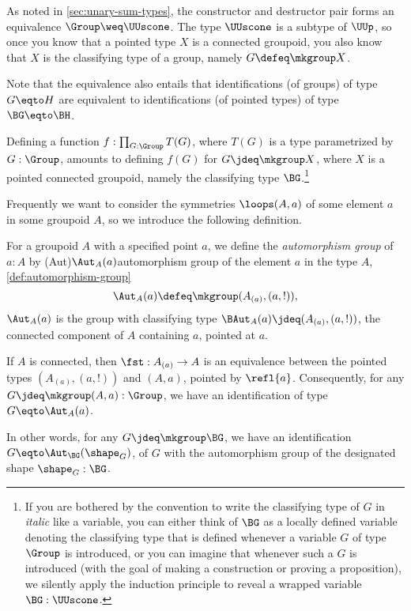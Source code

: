 \begin{remark}\label{rem:aut}
  As noted in \cref{sec:unary-sum-types},
  the constructor and destructor pair forms an equivalence $\Group \weq \UUscone$.
  The type $\UUscone$ is a subtype of $\UUp$, so
  once you know that a pointed type $X$ is a connected groupoid,
  you also know that $X$ is the classifying type of a group,
  namely $G\defeq\mkgroup X$.

  Note that the equivalence also entails that identifications (of groups) of type $G \eqto H$ are equivalent to identifications (of pointed
  types) of type $\BG \eqto \BH$.
\end{remark}

\begin{remark}\label{rem:BG-convention}
  Defining a function $f : \prod_{G:\Group}T(G)$,
  where $T(G)$ is a type parametrized by $G:\Group$,
  amounts to defining $f(G)$ for $G\jdeq\mkgroup X$,
  where $X$ is a pointed connected groupoid,
  namely the classifying type $\BG$.\footnote{%
    If you are bothered by the convention
    to write the classifying type of $G$ in \emph{italic} like a variable,
    you can either think of $\BG$ as a locally defined
    variable denoting the classifying type that is
    defined whenever a variable $G$ of type $\Group$ is introduced,
    or you can imagine that whenever such a $G$ is introduced
    (with the goal of making a construction or proving a proposition),
    we silently apply the induction principle to
    reveal a wrapped variable $\BG:\UUscone$.}
\end{remark}

Frequently we want to consider the symmetries $\loops(A,a)$ of some element $a$ in some groupoid $A$, so we introduce the following definition.

\begin{definition}\label{def:automorphism-group}
  For a groupoid $A$ with a specified point $a$,
  we define the \emph{automorphism group} of $a:A$ by%
  \glossary(Aut){$\protect\Aut_A(a)$}{automorphism group of the element $a$
    in the type $A$, \cref{def:automorphism-group}}%
  \[
    \Aut_A(a) \defeq \mkgroup (A_{(a)},(a,!)),
  \]
  \ie $\Aut_A(a)$ is the group with classifying type
  $\BAut_A(a) \jdeq (A_{(a)},(a,!))$,
  the connected component of $A$ containing $a$, pointed at $a$.
\end{definition}
\begin{remark}
  \label{rem:symmetriesofnonconnectedgroupoids}
  If $A$ is connected, then $\fst: A_{(a)} \to A$ is an equivalence 
  between the pointed types $(A_{(a)},(a,!))$ and $(A,a)$, pointed by $\refl{a}$.
  Consequently, for any $G \jdeq \mkgroup(A,a) : \Group$, 
  we have an identification of type $G \eqto \Aut_A(a)$.

  In other words, for any $G \jdeq \mkgroup\BG$, we have
  an identification $G \eqto \Aut_{\BG}(\shape_G)$, of $G$ with the automorphism
  group of the designated shape $\shape_G : \BG$.
\end{remark}

